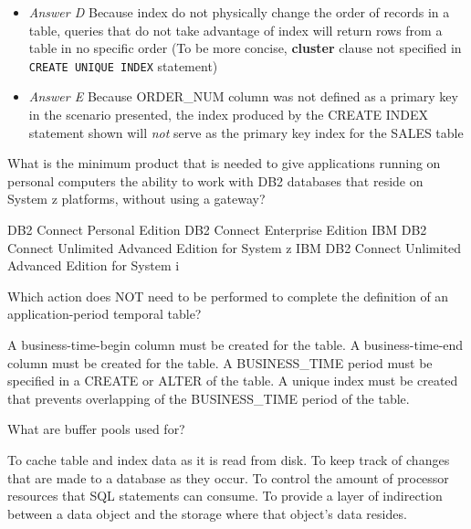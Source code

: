 \documentclass[answers, 11pt]{exam}
\begin{document}
\begin{questions}
\begin{solution}
	\begin{itemize}
		\item \textit{Answer D} Because index do not physically change the order of records in a table, queries that do not take advantage of index
		will return rows from a table in no specific order (To be more concise, \textbf{cluster} clause not specified in \texttt{CREATE UNIQUE INDEX} statement)
		\item \textit{Answer E} Because ORDER\_NUM column was not defined as a primary key in the scenario presented, the index produced by the CREATE INDEX
		statement shown will \textit{not} serve as the primary key index for the SALES table
	\end{itemize}
\end{solution}

\question[1]
What is the minimum product that is needed to give applications running on personal computers the 
ability to work with DB2 databases that reside on System z platforms, without using a gateway?
\begin{choices}
	\CorrectChoice DB2 Connect Personal Edition
	\choice DB2 Connect Enterprise Edition
	\choice IBM DB2 Connect Unlimited Advanced Edition for System z
	\choice IBM DB2 Connect Unlimited Advanced Edition for System i
\end{choices}

\newpage
\question[1]
Which action does NOT need to be performed to complete the definition of an application-period temporal
table?
\begin{choices}
	\choice A business-time-begin column must be created for the table.
	\choice A business-time-end column must be created for the table.
	\choice A BUSINESS\_TIME period must be specified in a CREATE or ALTER of the table.
	\CorrectChoice A unique index must be created that prevents overlapping of the BUSINESS\_TIME period of the 
	table.
\end{choices}

\question[1]
What are buffer pools used for?
\begin{choices}
	\CorrectChoice To cache table and index data as it is read from disk.
	\choice To keep track of changes that are made to a database as they occur.
	\choice To control the amount of processor resources that SQL statements can consume.
	\choice To provide a layer of indirection between a data object and the storage where that object's data
	resides.
\end{choices}


\end{questions}
\end{document}
